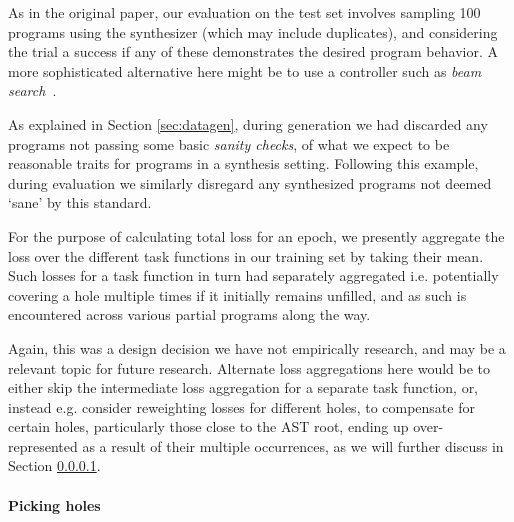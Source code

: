 \documentclass{article}
\begin{document}
As in the original paper,
our evaluation on the test set involves sampling 100 programs using the synthesizer (which may include duplicates),
and considering the trial a success if any of these demonstrates the desired program behavior.
A more sophisticated alternative here might be to use a controller such as \emph{beam search}~\citep{polosukhin2018neural}.

As explained in Section \ref{sec:datagen},
during generation we had discarded any programs not passing some basic \emph{sanity checks},
of what we expect to be reasonable traits for programs in a synthesis setting.
Following this example, during evaluation we similarly disregard any synthesized programs not deemed `sane' by this standard.

For the purpose of calculating total loss for an epoch,
we presently aggregate the loss over the different
task functions in our training set by taking their mean.
Such losses for a task function in turn had separately aggregated
i.e. potentially covering a hole multiple times if it initially remains unfilled,
and as such is encountered across various partial programs along the way.

Again, this was a design decision we have not empirically research,
and may be a relevant topic for future research.
Alternate loss aggregations here would be to either
skip the intermediate loss aggregation for a separate task function,
or, instead e.g. consider reweighting losses for different holes,
to compensate for certain holes, particularly those close to the AST root,
ending up over-represented as a result of their multiple occurrences,
as we will further discuss in Section \ref{sec:picking}.

\paragraph{Picking holes} \label{sec:picking}
\end{document}
